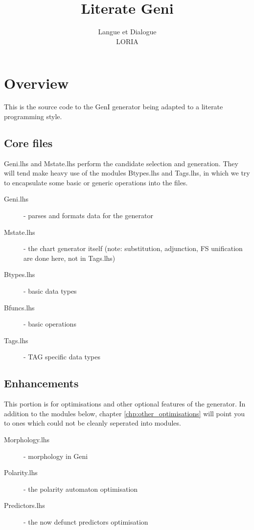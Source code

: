 \documentclass[11pt]{report}
\begin{document}
\title{Literate Geni}
\author{Langue et Dialogue\\LORIA}

\maketitle
\tableofcontents


\chapter{Overview}

This is the source code to the GenI generator being adapted to a
literate programming style.  

\section{Core files}

Geni.lhs and Mstate.lhs perform the candidate selection and generation.
They will tend make heavy use of the modules Btypes.lhs and Tags.lhs, in
which we try to encapsulate some basic or generic operations into the
files.

\begin{description}
 \item[Geni.lhs] - parses and formats data for the generator 
 \item[Mstate.lhs] - the chart generator itself (note: substitution,
 adjunction, FS unification are done here, not in Tags.lhs)
 \item[Btypes.lhs] - basic data types 
 \item[Bfuncs.lhs] - basic operations 
 \item[Tags.lhs] - TAG specific data types
\end{description}

\section{Enhancements}

This portion is for optimisations and other optional features of the
generator.
In addition to the modules below, chapter \ref{chp:other_optimisations}
will point you to ones which could not be cleanly seperated into
modules.

\begin{description}
 \item[Morphology.lhs] - morphology in Geni  
 \item[Polarity.lhs] - the polarity automaton optimisation 
 \item[Predictors.lhs] - the now defunct predictors optimisation
\end{description}
\end{document}
